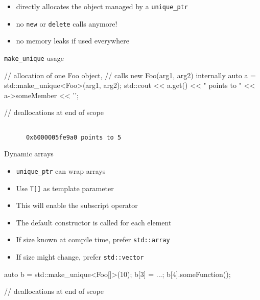 \begin{frame}[fragile]
  \begin{block}{}
    \begin{itemize}
      \item directly allocates the object managed by a \texttt{unique_ptr}
      \item no \texttt{new} or \texttt{delete} calls anymore!
      \item no memory leaks if used everywhere
    \end{itemize}
  \end{block}
  \pause
  \begin{exampleblock}{\texttt{make\_unique} usage}
    \begin{cppcode*}{}
      // allocation of one Foo object,
      // calls new Foo(arg1, arg2) internally
      auto a = std::make_unique<Foo>(arg1, arg2);
      std::cout << a.get() << " points to "
                << a->someMember << '\n';

      // deallocations at end of scope
    \end{cppcode*}
  \end{exampleblock}
  \begin{block}{}
    \begin{verbatim}

      0x6000005fe9a0 points to 5
    \end{verbatim}
  \end{block}
\end{frame}

\begin{advanced}

\begin{frame}[fragile]
  \begin{block}{Dynamic arrays}
    \begin{itemize}
      \item \texttt{unique_ptr} can wrap arrays
      \item Use \texttt{T[]} as template parameter
      \item This will enable the subscript operator
      \item The default constructor is called for each element
      \item If size known at compile time, prefer \texttt{std::array}
      \item If size might change, prefer \texttt{std::vector}
    \end{itemize}
  \end{block}
  \begin{exampleblock}{}
    \begin{cppcode*}{}
      auto b = std::make_unique<Foo[]>(10);
      b[3] = ...;
      b[4].someFunction();

      // deallocations at end of scope
    \end{cppcode*}
  \end{exampleblock}
\end{frame}

\end{advanced}

